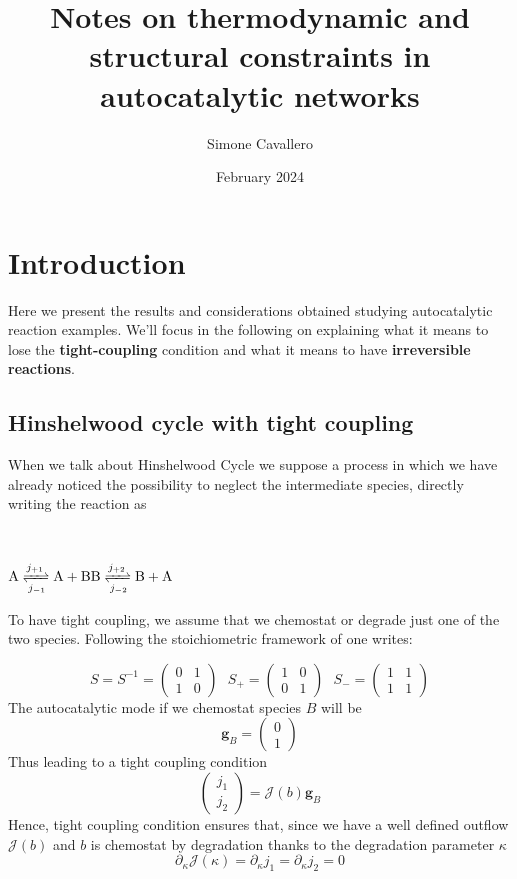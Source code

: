 \documentclass{article}
\title{Notes on thermodynamic and structural constraints in autocatalytic networks}
\author{Simone Cavallero}
\date{February 2024}
\begin{document}
	
	\maketitle
	
	\section{Introduction}
	Here we present the results and considerations obtained studying autocatalytic reaction examples. We'll focus in the following on explaining what it means to lose the \textbf{tight-coupling} condition and what it means to have \textbf{irreversible reactions}.
	
	\subsection{Hinshelwood cycle with tight coupling}
	When we talk about Hinshelwood Cycle we suppose a process in which we have already noticed the possibility to neglect the intermediate species, directly writing the reaction as 
	
	\\
	\begin{center}
		\newline
		$\mathrm{A} \xrightleftharpoons[j_{-1}]{j_{+1}}\mathrm{A+B}\\
		\mathrm{B} \xrightleftharpoons[j_{-2}]{j_{+2}}\mathrm{B+A}\\$
	\end{center}
	
	To have tight coupling, we assume that we chemostat or degrade just one of the two species. Following the stoichiometric framework of \cite{1} one writes:
	
	
	
	$$S=S^{-1}=
	\begin{pmatrix}
		0 & 1 \\
		1 & 0 
	\end{pmatrix}
	\ \ \ S_{+}=
	\begin{pmatrix}
		1 & 0 \\
		0 & 1 
	\end{pmatrix}
	\ \ \ S_{-}=
	\begin{pmatrix}
		1 & 1 \\
		1 & 1 
	\end{pmatrix}
	$$
	The autocatalytic mode if we chemostat species $B$ will be $$\mathbf{g}_B=\begin{pmatrix}
		0 \\ 1 
	\end{pmatrix}$$
	Thus leading to a tight coupling condition $$\begin{pmatrix}
		j_1 \\ j_2 
	\end{pmatrix}=\mathcal{J}(b) \mathbf{g}_B$$
	Hence, tight coupling condition ensures that, since we have a well defined outflow $\mathcal{J}(b)$ and $b$ is chemostat by degradation thanks to the degradation parameter $\kappa$
	$$\partial_{\kappa} \mathcal{J}(\kappa) = \partial_{\kappa} j_1 = \partial_{\kappa} j_2=0$$
	
\end{document}
